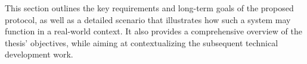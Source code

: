 This section outlines the key requirements and long-term goals of the proposed \pol{} protocol, as well as a detailed scenario that illustrates how such a system may function in a real-world context. It also provides a comprehensive overview of the thesis' objectives, while aiming at contextualizing the subsequent technical development work.